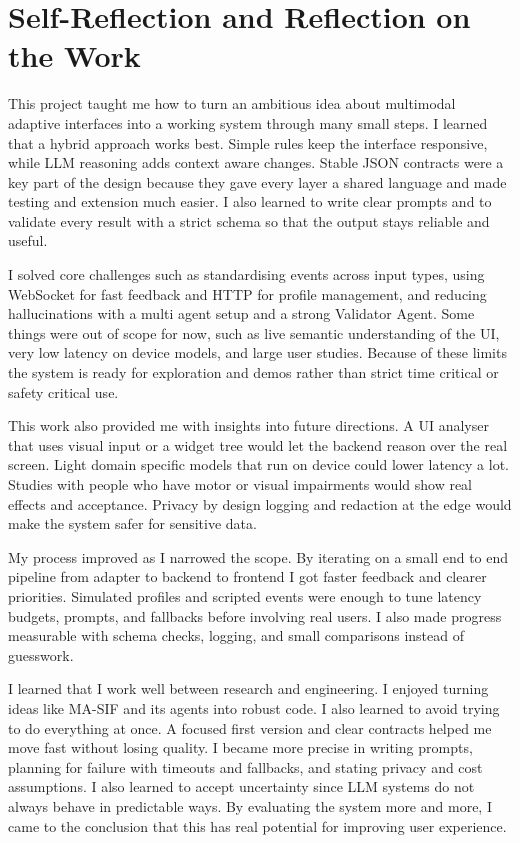 \section{Self-Reflection and Reflection on the Work}

This project taught me how to turn an ambitious idea about multimodal adaptive interfaces into a working system through many small steps. I learned that a hybrid approach works best. Simple rules keep the interface responsive, while LLM reasoning adds context aware changes. Stable JSON contracts were a key part of the design because they gave every layer a shared language and made testing and extension much easier. I also learned to write clear prompts and to validate every result with a strict schema so that the output stays reliable and useful.

I solved core challenges such as standardising events across input types, using WebSocket for fast feedback and HTTP for profile management, and reducing hallucinations with a multi agent setup and a strong Validator Agent. Some things were out of scope for now, such as live semantic understanding of the UI, very low latency on device models, and large user studies. Because of these limits the system is ready for exploration and demos rather than strict time critical or safety critical use.

This work also provided me with insights into future directions. A UI analyser that uses visual input or a widget tree would let the backend reason over the real screen. Light domain specific models that run on device could lower latency a lot. Studies with people who have motor or visual impairments would show real effects and acceptance. Privacy by design logging and redaction at the edge would make the system safer for sensitive data.

My process improved as I narrowed the scope. By iterating on a small end to end pipeline from adapter to backend to frontend I got faster feedback and clearer priorities. Simulated profiles and scripted events were enough to tune latency budgets, prompts, and fallbacks before involving real users. I also made progress measurable with schema checks, logging, and small comparisons instead of guesswork.

I learned that I work well between research and engineering. I enjoyed turning ideas like MA-SIF and its agents into robust code. I also learned to avoid trying to do everything at once. A focused first version and clear contracts helped me move fast without losing quality. I became more precise in writing prompts, planning for failure with timeouts and fallbacks, and stating privacy and cost assumptions. I also learned to accept uncertainty since LLM systems do not always behave in predictable ways. By evaluating the system more and more, I came to the conclusion that this has real potential for improving user experience.

